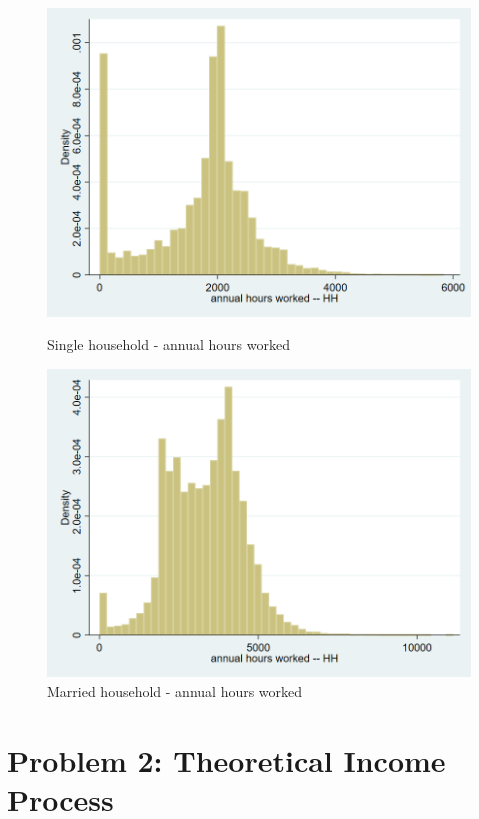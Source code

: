 \documentclass[12pt,a4paper]{article}
\begin{document}
\newpage

\begin{figure}[h]
  \centering
  \begin{minipage}[b]{0.45\textwidth}
    \includegraphics[width=\textwidth]{stata_output/Hrs_hh_nm.png}
    \caption{Single household - annual hours worked}
  \end{minipage}
  \hfill
  \begin{minipage}[b]{0.45\textwidth}
    \includegraphics[width=\textwidth]{stata_output/Hrs_hh_m.png}
    \caption{Married household - annual hours worked}
  \end{minipage}
\end{figure}


\section*{Problem 2: Theoretical Income Process}
\end{document}
